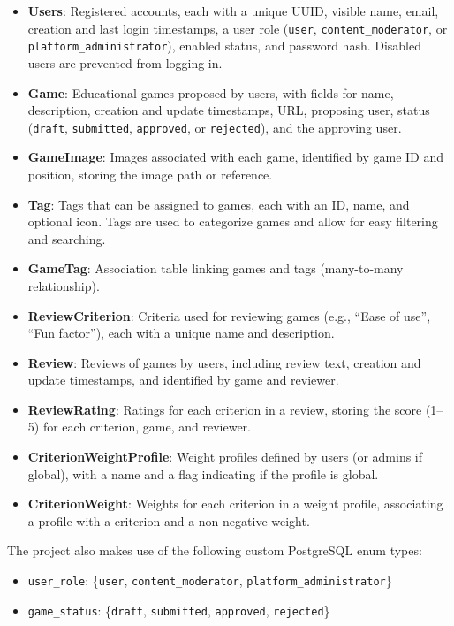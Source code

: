 \documentclass[11pt,italian,a4paper]{article}
\begin{document}
\begin{itemize}
    \item \textbf{Users}: Registered accounts, each with a unique UUID, visible name, email, creation and last login timestamps, a user role (\texttt{user}, \texttt{content\_moderator}, or \texttt{platform\_administrator}), enabled status, and password hash. Disabled users are prevented from logging in.
    \item \textbf{Game}: Educational games proposed by users, with fields for name, description, creation and update timestamps, URL, proposing user, status (\texttt{draft}, \texttt{submitted}, \texttt{approved}, or \texttt{rejected}), and the approving user.
    \item \textbf{GameImage}: Images associated with each game, identified by game ID and position, storing the image path or reference.
    \item \textbf{Tag}: Tags that can be assigned to games, each with an ID, name, and optional icon. Tags are used to categorize games and allow for easy filtering and searching.
    \item \textbf{GameTag}: Association table linking games and tags (many-to-many relationship).
    \item \textbf{ReviewCriterion}: Criteria used for reviewing games (e.g., ``Ease of use'', ``Fun factor''), each with a unique name and description.
    \item \textbf{Review}: Reviews of games by users, including review text, creation and update timestamps, and identified by game and reviewer.
    \item \textbf{ReviewRating}: Ratings for each criterion in a review, storing the score (1--5) for each criterion, game, and reviewer.
    \item \textbf{CriterionWeightProfile}: Weight profiles defined by users (or admins if global), with a name and a flag indicating if the profile is global.
    \item \textbf{CriterionWeight}: Weights for each criterion in a weight profile, associating a profile with a criterion and a non-negative weight.
\end{itemize}

\noindent The project also makes use of the following custom PostgreSQL enum types:
\begin{itemize}
    \item \texttt{user\_role}: \{\texttt{user}, \texttt{content\_moderator}, \texttt{platform\_administrator}\}
    \item \texttt{game\_status}: \{\texttt{draft}, \texttt{submitted}, \texttt{approved}, \texttt{rejected}\}
\end{itemize}
\end{document}
